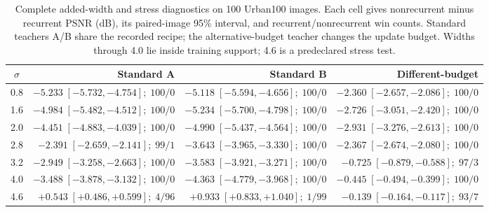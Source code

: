 \begin{table}[t]
\caption{Complete added-width and stress diagnostics on 100 Urban100 images. Each cell gives nonrecurrent minus recurrent PSNR (dB), its paired-image 95\% interval, and recurrent/nonrecurrent win counts. Standard teachers A/B share the recorded recipe; the alternative-budget teacher changes the update budget. Widths through 4.0 lie inside training support; 4.6 is a predeclared stress test.}
\label{tab:supp_width_complete}
\centering\footnotesize
\setlength{\tabcolsep}{3pt}
\renewcommand{\arraystretch}{1.05}
\begin{tabular*}{\textwidth}{@{\extracolsep{\fill}}crrr@{}}
\toprule
$\sigma$ & Standard A & Standard B & Different-budget\\
\midrule
0.8 & $-5.233\;[-5.732,-4.754];\;100/0$ & $-5.118\;[-5.594,-4.656];\;100/0$ & $-2.360\;[-2.657,-2.086];\;100/0$\\
1.6 & $-4.984\;[-5.482,-4.512];\;100/0$ & $-5.234\;[-5.700,-4.798];\;100/0$ & $-2.726\;[-3.051,-2.420];\;100/0$\\
2.0 & $-4.451\;[-4.883,-4.039];\;100/0$ & $-4.990\;[-5.437,-4.564];\;100/0$ & $-2.931\;[-3.276,-2.613];\;100/0$\\
2.8 & $-2.391\;[-2.659,-2.141];\;99/1$ & $-3.643\;[-3.965,-3.330];\;100/0$ & $-2.367\;[-2.674,-2.080];\;100/0$\\
3.2 & $-2.949\;[-3.258,-2.663];\;100/0$ & $-3.583\;[-3.921,-3.271];\;100/0$ & $-0.725\;[-0.879,-0.588];\;97/3$\\
4.0 & $-3.488\;[-3.878,-3.132];\;100/0$ & $-4.363\;[-4.779,-3.968];\;100/0$ & $-0.445\;[-0.494,-0.399];\;100/0$\\
\midrule
4.6 & $+0.543\;[+0.486,+0.599];\;4/96$ & $+0.933\;[+0.833,+1.040];\;1/99$ & $-0.139\;[-0.164,-0.117];\;93/7$\\
\bottomrule
\end{tabular*}
\end{table}
